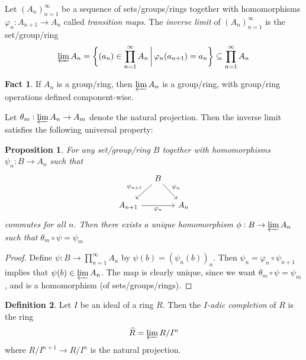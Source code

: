 \documentclass[11pt]{article}
\theoremstyle{definition}
\newtheorem{definition}{Definition}[subsection]
\newtheorem*{fact}{Fact}
\theoremstyle{plain}
\newtheorem{proposition}[definition]{Proposition}
\theoremstyle{remark}
\begin{document}
Let $(A_n)_{n=1}^\infty$ be a sequence of sets/groups/rings together with homomorphisms $\varphi_n : A_{n+1} \to A_n$ called \emph{transition maps}. The \emph{inverse limit} of $(A_n)_{n=1}^\infty$ is the set/group/ring
\begin{equation*}
    \varprojlim A_n = \bigg\{(a_n) \in \prod_{n=1}^\infty A_n \,\bigg\vert\, \varphi_n(a_{n+1}) = a_n\bigg\} \subseteq \prod_{n=1}^\infty A_n
\end{equation*}

\begin{fact}
    If $A_n$ is a group/ring, then $\varprojlim A_n$ is a group/ring, with group/ring operations defined component-wise.
\end{fact}

Let $\theta_m : \varprojlim A_n \to A_m$ denote the natural projection. Then the inverse limit satisfies the following universal property:

\begin{proposition}\label{prop:3_3}
    For any set/group/ring $B$ together with homomorphisms $\psi_n : B \to A_n$ such that
    \begin{equation*}
    \begin{tikzcd}[column sep=small]
        & B \arrow[ld, "\psi_{n+1}"'] \arrow[rd, "\psi_n"] &\\
        A_{n+1} \arrow[rr, "\varphi_n"'] & & A_n
    \end{tikzcd}
    \end{equation*}
    commutes for all $n$. Then there exists a unique homomorphism $\phi : B \to \varprojlim A_n$ such that $\theta_m \circ \psi = \psi_m$
\end{proposition}
\begin{proof}
    Define $\psi : B \to \prod_{n=1}^\infty A_n$ by $\psi(b) = (\psi_n(b))_n$. Then $\psi_n = \varphi_n \circ \psi_{n+1}$ implies that $\psi(b) \in \varprojlim A_n$. The map is clearly unique, since we want $\theta_m \circ \psi = \psi_m$, and is a homomorphism (of sets/groups/rings).
\end{proof}

\begin{definition}\label{def:3_4}
    Let $I$ be an ideal of a ring $R$. Then the \emph{$I$-adic completion} of $R$ is the ring
    \begin{equation*}
        \widehat{R} = \varprojlim R/I^n
    \end{equation*}
    where $R/I^{n+1} \to R/I^n$ is the natural projection.
\end{definition}
\end{document}
